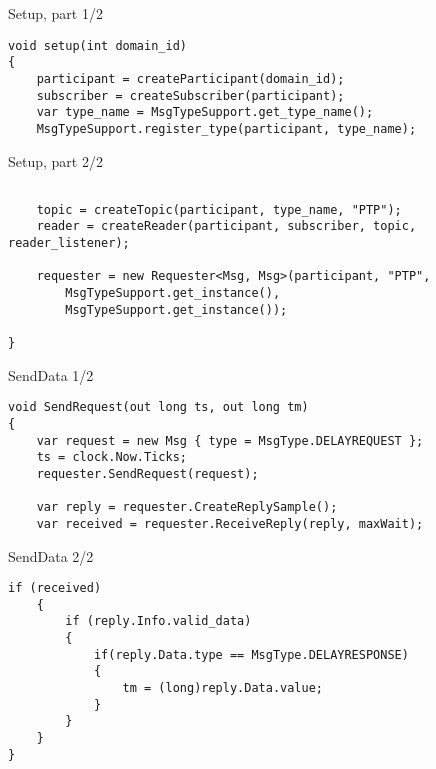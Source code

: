 \documentclass[compressed, presentation, notheorems, 12pt]{beamer}
\begin{document}
	\begin{frame}[containsverbatim]{Setup, part 1/2}
	\begin{lstlisting}[style=Code-C++]
void setup(int domain_id)
{
	participant = createParticipant(domain_id);
	subscriber = createSubscriber(participant);		
	var type_name = MsgTypeSupport.get_type_name();
	MsgTypeSupport.register_type(participant, type_name);

	\end{lstlisting}
	\end{frame}


	\begin{frame}[containsverbatim]{Setup, part 2/2}
	\begin{lstlisting}[style=Code-C++]

	topic = createTopic(participant, type_name, "PTP");
	reader = createReader(participant, subscriber, topic, reader_listener);

	requester = new Requester<Msg, Msg>(participant, "PTP",
		MsgTypeSupport.get_instance(),
		MsgTypeSupport.get_instance());

}
	\end{lstlisting}
	\end{frame}




	\begin{frame}[containsverbatim]{SendData 1/2}
	\begin{lstlisting}[style=Code-C++]
void SendRequest(out long ts, out long tm)
{
	var request = new Msg { type = MsgType.DELAYREQUEST };
	ts = clock.Now.Ticks;
	requester.SendRequest(request);

	var reply = requester.CreateReplySample();
	var received = requester.ReceiveReply(reply, maxWait);

	\end{lstlisting}
	\end{frame}



	\begin{frame}[containsverbatim]{SendData 2/2}
	\begin{lstlisting}[style=Code-C++]
	if (received)
	{
		if (reply.Info.valid_data)
		{
			if(reply.Data.type == MsgType.DELAYRESPONSE)
			{
				tm = (long)reply.Data.value;
			}
		}
	}
}
	\end{lstlisting}
	\end{frame}
\end{document}

